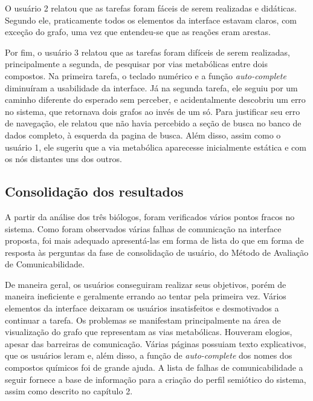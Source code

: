 \indent O usuário 2 relatou que as tarefas foram fáceis de serem realizadas e didáticas. Segundo ele, praticamente todos os elementos da interface estavam claros, com exceção do grafo, uma vez que entendeu-se que as reações eram arestas.

\indent Por fim, o usuário 3 relatou que as tarefas foram difíceis de serem realizadas, principalmente a segunda, de pesquisar por vias metabólicas entre dois compostos. Na primeira tarefa, o teclado numérico e a função \textit{auto-complete} diminuíram a usabilidade da interface. Já na segunda tarefa, ele seguiu por um caminho diferente do esperado sem perceber, e acidentalmente descobriu um erro no sistema, que retornava dois grafos ao invés de um só. Para justificar seu erro de navegação, ele relatou que não havia percebido a seção de busca no banco de dados completo, à esquerda da pagina de busca. Além disso, assim como o usuário 1, ele sugeriu que a via metabólica aparecesse inicialmente estática e com os nós distantes uns dos outros.

\subsection{Consolidação dos resultados}

\indent A partir da análise dos três biólogos, foram verificados vários pontos fracos no sistema. Como foram observados várias falhas de comunicação na interface proposta, foi mais adequado apresentá-las em forma de lista do que em forma de resposta às perguntas da fase de consolidação de usuário, do Método de Avaliação de Comunicabilidade.

\indent De maneira geral, os usuários conseguiram realizar seus objetivos, porém de maneira ineficiente e geralmente errando ao tentar pela primeira vez. Vários elementos da interface deixaram os usuários insatisfeitos e desmotivados a continuar a tarefa. Os problemas se manifestam principalmente na área de visualização do grafo que representam as vias metabólicas. Houveram elogios, apesar das barreiras de comunicação. Várias páginas possuiam texto explicativos, que os usuários leram e, além disso, a função de \textit{auto-complete} dos nomes dos compostos químicos foi de grande ajuda. A lista de falhas de comunicabilidade a seguir fornece a base de informação para a criação do perfil semiótico do sistema, assim como descrito no capítulo 2.

